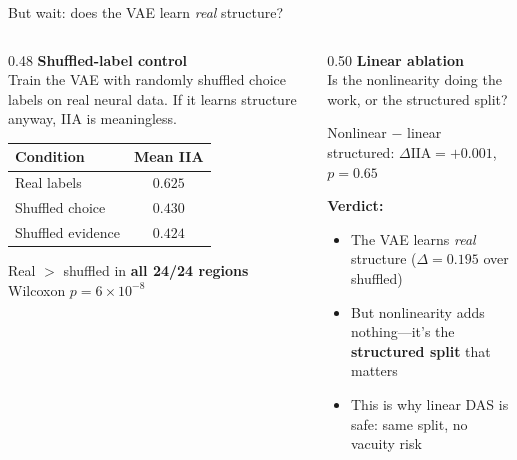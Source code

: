 \documentclass[aspectratio=169,11pt]{beamer}
\begin{document}
\begin{frame}{But wait: does the VAE learn \emph{real} structure?}
\begin{columns}[T]
\begin{column}{0.48\textwidth}
\textbf{Shuffled-label control}\\[0.3em]
{\small Train the VAE with randomly shuffled choice labels on real neural data. If it learns structure anyway, IIA is meaningless.}

\vspace{0.5em}
\centering
{\small
\begin{tabular}{lc}
\toprule
\textbf{Condition} & \textbf{Mean IIA} \\
\midrule
Real labels & $\mathbf{0.625}$ \\
Shuffled choice & $0.430$ \\
Shuffled evidence & $0.424$ \\
\bottomrule
\end{tabular}
}

\vspace{0.3em}
{\small Real $>$ shuffled in \textbf{all 24/24 regions}\\
Wilcoxon $p = 6 \times 10^{-8}$}
\end{column}
\begin{column}{0.50\textwidth}
\textbf{Linear ablation}\\[0.3em]
{\small Is the nonlinearity doing the work, or the structured split?}

\vspace{0.5em}
{\small Nonlinear $-$ linear structured: $\Delta\text{IIA} = +0.001$, $p = 0.65$}

\vspace{0.5em}
\textbf{Verdict:}
\begin{itemize}
  \item The VAE learns \emph{real} structure ($\Delta = 0.195$ over shuffled)
  \item But nonlinearity adds nothing---it's the \textbf{structured split} that matters
  \item This is why linear DAS is safe: same split, no vacuity risk
\end{itemize}
\end{column}
\end{columns}
\end{frame}
\end{document}
